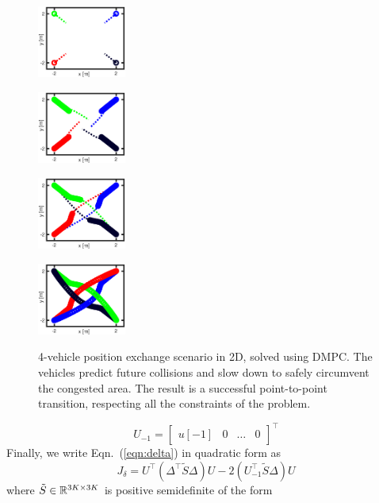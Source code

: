  \begin{figure}
 	\centering
 	
 	\begin{subfloat}{
 		\includegraphics[width=0.26\textwidth]{figures/rail_a}}
 	\end{subfloat} \hspace{-5ex}
 	\begin{subfloat}{
 			\includegraphics[width=0.26\textwidth]{figures/rail_b}}
 	\end{subfloat} \hspace{-5ex}
 	\begin{subfloat}{
 			\includegraphics[width=0.26\textwidth]{figures/rail_c}}
 	\end{subfloat} \hspace{-5ex}
 	\begin{subfloat}{
 			\includegraphics[width=0.26\textwidth]{figures/rail_d}}
 	\end{subfloat} 
 	\caption{4-vehicle position exchange scenario in 2D, solved using DMPC. The vehicles predict future collisions and slow down to safely circumvent the congested area. The result is a successful point-to-point transition, respecting all the constraints of the problem. }
 	\label{fig:four}
 \end{figure}
\begin{equation}
U_{-1} = \begin{bmatrix}
u[-1] & 0 & \ldots & 0
\end{bmatrix}^\top
\end{equation}
Finally, we write Eqn.~(\ref{eqn:delta}) in quadratic form as
\begin{equation}
\label{eqn:var}
J_\delta = U^\top (\Delta^\top \tilde{S} \Delta) U - 2(U_{-1}^\top \tilde{S} \Delta )U
\end{equation}	
where $\tilde{S} \in {\mathbb R}^{3K \times 3K}$ is positive semidefinite of the form

